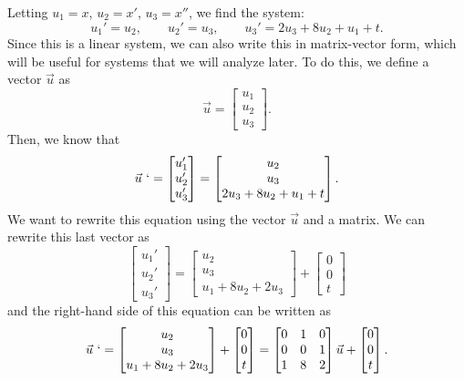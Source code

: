 \begin{exampleSol}
Letting $u_1 = x$, $u_2 = x'$, $u_3
= x''$, we find the system:
\begin{equation*}
u_1' = u_2, \qquad u_2' = u_3, \qquad u_3' = 2u_3 + 8u_2 + u_1 + t.
\end{equation*}
Since this is a linear system, we can also write this in matrix-vector form, which will be useful for systems that we will analyze later. To do this, we define a vector $\vec{u}$ as
\begin{equation*}
\vec{u} = \begin{bmatrix} u_1 \\ u_2 \\ u_3 \end{bmatrix}.
\end{equation*}
Then, we know that
\begin{equation*}
\vec{u}\ ` = \begin{bmatrix} u_1'\\ u_2'\\ u_3' \end{bmatrix} = \begin{bmatrix} u_2 \\ u_3 \\ 2u_3 + 8u_2 + u_1 + t \end{bmatrix}.
\end{equation*}
We want to rewrite this equation using the vector $\vec{u}$ and a matrix. We can rewrite this last vector as 
\begin{equation*}
\begin{bmatrix} u_1'\\ u_2'\\ u_3' \end{bmatrix} = \begin{bmatrix} u_2 \\ u_3 \\ u_1 + 8u_2 + 2u_3 \end{bmatrix} + \begin{bmatrix}0 \\ 0 \\ t \end{bmatrix}
\end{equation*}
and the right-hand side of this equation can be written as
\begin{equation*}
\vec{u}\ ` =  \begin{bmatrix} u_2 \\ u_3 \\ u_1 + 8u_2 + 2u_3 \end{bmatrix} + \begin{bmatrix}0 \\ 0 \\ t \end{bmatrix} = \begin{bmatrix} 0 & 1 & 0 \\ 0 & 0 & 1 \\ 1 & 8 & 2 \end{bmatrix} \vec{u} + \begin{bmatrix} 0 \\ 0 \\ t \end{bmatrix}. 

\end{equation*}
\end{exampleSol}
